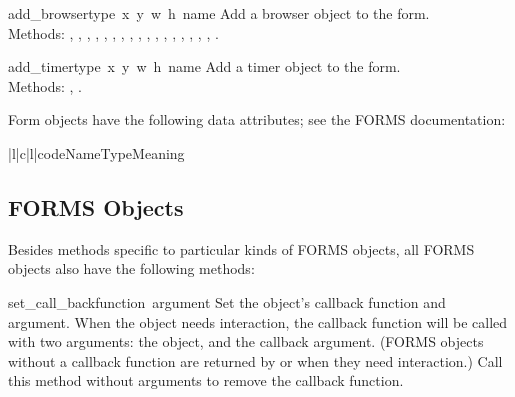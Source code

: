 \begin{flushleft}
\begin{funcdesc}{add_browser}{type\, x\, y\, w\, h\, name}
Add a browser object to the form. \\
Methods:
,
,
,
,
,
,
,
,
,
,
,
,
,
,
,
,
,
.
\end{funcdesc}


\begin{funcdesc}{add_timer}{type\, x\, y\, w\, h\, name}
Add a timer object to the form. \\
Methods:
,
.
\end{funcdesc}
\end{flushleft}

Form objects have the following data attributes; see the FORMS
documentation:

\begin{tableiii}{|l|c|l|}{code}{Name}{Type}{Meaning}
\end{tableiii}

\subsection{FORMS Objects}

Besides methods specific to particular kinds of FORMS objects, all
FORMS objects also have the following methods:

\begin{funcdesc}{set_call_back}{function\, argument}
Set the object's callback function and argument.  When the object
needs interaction, the callback function will be called with two
arguments: the object, and the callback argument.  (FORMS objects
without a callback function are returned by  or
 when they need interaction.)  Call this method
without arguments to remove the callback function.
\end{funcdesc}

